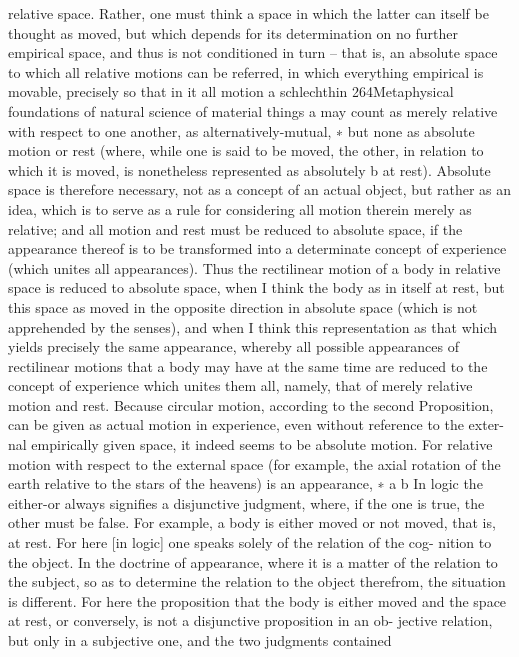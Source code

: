 relative space. Rather, one must think a space in which the latter can
itself be thought as moved, but which depends for its determination on
no further empirical space, and thus is not conditioned in turn – that
is, an absolute space to which all relative motions can be referred, in
which everything empirical is movable, precisely so that in it all motion
a
schlechthin
264Metaphysical foundations of natural science
of material things a may count as merely relative with respect to one
another, as alternatively-mutual, ∗ but none as absolute motion or rest
(where, while one is said to be moved, the other, in relation to which it is
moved, is nonetheless represented as absolutely b at rest). Absolute space
is therefore necessary, not as a concept of an actual object, but rather
as an idea, which is to serve as a rule for considering all motion therein
merely as relative; and all motion and rest must be reduced to absolute
space, if the appearance thereof is to be transformed into a determinate
concept of experience (which unites all appearances).
Thus the rectilinear motion of a body in relative space is reduced
to absolute space, when I think the body as in itself at rest, but this
space as moved in the opposite direction in absolute space (which is
not apprehended by the senses), and when I think this representation
as that which yields precisely the same appearance, whereby all possible
appearances of rectilinear motions that a body may have at the same time
are reduced to the concept of experience which unites them all, namely,
that of merely relative motion and rest.
Because circular motion, according to the second Proposition, can be
given as actual motion in experience, even without reference to the exter-
nal empirically given space, it indeed seems to be absolute motion. For
relative motion with respect to the external space (for example, the axial
rotation of the earth relative to the stars of the heavens) is an appearance,
∗
a
b
In logic the either-or always signiﬁes a disjunctive judgment, where, if the one is
true, the other must be false. For example, a body is either moved or not moved,
that is, at rest. For here [in logic] one speaks solely of the relation of the cog-
nition to the object. In the doctrine of appearance, where it is a matter of the
relation to the subject, so as to determine the relation to the object therefrom,
the situation is different. For here the proposition that the body is either moved
and the space at rest, or conversely, is not a disjunctive proposition in an ob-
jective relation, but only in a subjective one, and the two judgments contained
